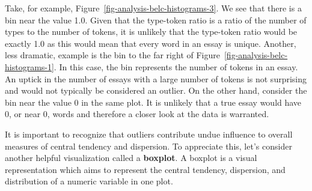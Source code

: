 \documentclass[
  letterpaper,
  krantz1]{latex/krantz-mod}
\theoremstyle{definition}
\theoremstyle{definition}
\theoremstyle{remark}
\begin{document}
Take, for example, Figure~\ref{fig-analysis-belc-histograms-3}. We see
that there is a bin near the value 1.0. Given that the type-token
ratio is a ratio of the number of types to
the number of tokens, it is unlikely that the type-token ratio would be
exactly 1.0 as this would mean that every word in an essay is unique.
Another, less dramatic, example is the bin to the far right of
Figure~\ref{fig-analysis-belc-histograms-1}. In this case, the bin
represents the number of tokens in an essay. An uptick in the number of
essays with a large number of tokens is not surprising and would not
typically be considered an outlier. On the other hand, consider the bin
near the value 0 in the same plot. It is unlikely that a true essay
would have 0, or near 0, words and therefore a closer look at the data
is warranted.

It is important to recognize that outliers contribute
undue influence to overall measures of central
tendency and dispersion. To
appreciate this, let's consider another helpful visualization called a
\textbf{boxplot}. A boxplot is a visual representation
which aims to represent the central tendency, dispersion, and
distribution of a numeric variable in one plot.
\end{document}
